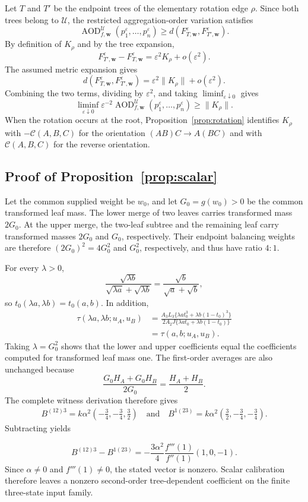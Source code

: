 \documentclass[11pt]{article}
\theoremstyle{plain}
\theoremstyle{definition}
\theoremstyle{definition}
\newcommand{\AOD}{\operatorname{AOD}}
\newcommand{\eps}{\varepsilon}
\newcommand{\Curv}{\mathcal C}
\newcommand{\wv}{\mathbf w}
\newcommand{\Fw}[1]{F_{#1,\wv}^{\eps}}
\newcommand{\AODfw}{\AOD_{f,\wv}}
\begin{document}
Let $T$ and $T'$ be the endpoint trees of the elementary rotation edge $\rho$. Since both trees belong to $\mathcal U$, the restricted aggregation-order variation satisfies
\[
\AODfw^{\mathcal U}(p_1^\eps,\ldots,p_n^\eps)
\ge d(\Fw{T},\Fw{T'}).
\]
By definition of $K_\rho$ and by the tree expansion,
\[
\Fw{T'}-\Fw{T}=\eps^2K_\rho+o(\eps^2).
\]
The assumed metric expansion gives
\[
d(\Fw{T},\Fw{T'})=\eps^2\|K_\rho\|+o(\eps^2).
\]
Combining the two terms, dividing by $\eps^2$, and taking $\liminf_{\eps\downarrow0}$ gives
\[
\liminf_{\eps\downarrow0}\eps^{-2}\AODfw^{\mathcal U}(p_1^\eps,\ldots,p_n^\eps)
\ge \|K_\rho\|.
\]
When the rotation occurs at the root, Proposition~\ref{prop:rotation} identifies $K_\rho$ with $-\Curv(A,B,C)$ for the orientation $(AB)C\to A(BC)$ and with $\Curv(A,B,C)$ for the reverse orientation.

\subsection{Proof of Proposition~\ref{prop:scalar}}

Let the common supplied weight be $w_0$, and let $G_0=g(w_0)>0$ be the common transformed leaf mass. The lower merge of two leaves carries transformed mass $2G_0$. At the upper merge, the two-leaf subtree and the remaining leaf carry transformed masses $2G_0$ and $G_0$, respectively. Their endpoint balancing weights are therefore $(2G_0)^2=4G_0^2$ and $G_0^2$, respectively, and thus have ratio $4:1$.

For every $\lambda>0$,
\[
\frac{\sqrt{\lambda b}}{\sqrt{\lambda a}+\sqrt{\lambda b}}
=\frac{\sqrt b}{\sqrt a+\sqrt b},
\]
so $t_0(\lambda a,\lambda b)=t_0(a,b)$. In addition,
\[
\begin{aligned}
\tau(\lambda a,\lambda b;u_A,u_B)
&=\frac{A_3L_3\{\lambda a t_0^3+\lambda b(1-t_0)^3\}}
{2A_2J\{\lambda a t_0+\lambda b(1-t_0)\}}\\
&=\tau(a,b;u_A,u_B).
\end{aligned}
\]
Taking $\lambda=G_0^2$ shows that the lower and upper coefficients equal the coefficients computed for transformed leaf mass one. The first-order averages are also unchanged because
\[
\frac{G_0H_A+G_0H_B}{2G_0}=\frac{H_A+H_B}{2}.
\]
The complete witness derivation therefore gives
\[
\begin{aligned}
B^{(12)3}
=k\alpha^2\left(-\frac34,-\frac34,\frac32\right) \quad\text{and}\quad
B^{1(23)}
=k\alpha^2\left(\frac32,-\frac34,-\frac34\right).
\end{aligned}
\]
Subtracting yields

\[
B^{(12)3}-B^{1(23)}
=-\frac{3\alpha^2}{4}\frac{f'''(1)}{f''(1)}(1,0,-1).
\]
Since $\alpha\ne0$ and $f'''(1)\ne0$, the stated vector is nonzero. Scalar calibration therefore leaves a nonzero second-order tree-dependent coefficient on the finite three-state input family.
\end{document}
